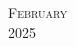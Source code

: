 \documentclass[10pt]{article} %
\begin{document}


\begin{center}
	\textsc{\LARGE February}\\ %
	\textsc{\large 2025} %
\end{center}


\begin{calendar}{\textwidth} %





\BlankDay
\BlankDay
\BlankDay
\BlankDay
\BlankDay
\BlankDay



\end{calendar}
\end{document}
